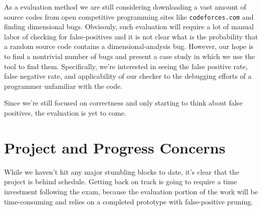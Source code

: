 \documentclass[12pt]{article}
\begin{document}
As a evaluation method we are still considering downloading a vast amount of source codes from open competitive programming sites like \texttt{codeforces.com} and finding dimensional bugs.
Obvisouly, such evaluation will require a lot of manual labor of checking for false-positives and it is not clear what is the probability that a random source code contains a dimensional-analysis bug. However, our hope is to find a nontrivial number of bugs and present a case study in which we use the tool to find them.
Specifically, we're interested in seeing the false positive rate, false negative rate, and applicability of our checker to the debugging efforts of a programmer unfamiliar with the code.

Since we're still focused on correctness and only starting to think about false positives, the evaluation is yet to come.

\section{Project and Progress Concerns}

While we haven't hit any major stumbling blocks to date, it's clear that the project is behind schedule.
Getting back on track is going to require a time investment following the exam, because the evaluation portion of the work will be time-consuming and relies on a completed prototype with false-positive pruning.





\end{document}
